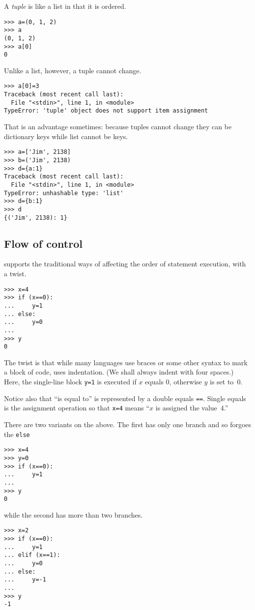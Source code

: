 A \textit{tuple} is like a list in that it is ordered.
\begin{lstlisting}[style=python]
>>> a=(0, 1, 2)
>>> a
(0, 1, 2)
>>> a[0]
0
\end{lstlisting}
Unlike a list, however, a tuple cannot change.
\begin{lstlisting}[style=python]
>>> a[0]=3
Traceback (most recent call last):
  File "<stdin>", line 1, in <module>
TypeError: 'tuple' object does not support item assignment
\end{lstlisting}
That is an advantage sometimes:
because tuples cannot change they can be dictionary keys while
list cannot be keys.
\begin{lstlisting}[style=python]
>>> a=['Jim', 2138]
>>> b=('Jim', 2138)
>>> d={a:1}
Traceback (most recent call last):
  File "<stdin>", line 1, in <module>
TypeError: unhashable type: 'list'
>>> d={b:1}
>>> d
{('Jim', 2138): 1}
\end{lstlisting}



\subsection{Flow of control}
\python{} supports the traditional ways of affecting the order of 
statement execution, with a twist.
\begin{lstlisting}[style=python]
>>> x=4
>>> if (x==0):
...     y=1
... else:
...     y=0
... 
>>> y
0
\end{lstlisting}
The twist is that while many languages use braces or some other syntax to
mark a block of code, \python{} uses indentation.
(We shall always indent with four spaces.)
Here, the single-line block \lstinline[style=inline]!y=1! is executed if $x$
equals $0$, otherwise $y$ is set to~$0$. 

Notice also that ``is equal to'' is represented by a double equals
\lstinline[style=inline]!==!. 
Single equals is the assignment
operation so that \lstinline[style=inline]!x=4! 
means ``$x$ is assigned the value~$4$.'' 

There are two variants on the above.
The first has only one branch and so forgoes the \lstinline[style=inline]!else!
\begin{lstlisting}[style=python]
>>> x=4
>>> y=0
>>> if (x==0):
...     y=1
... 
>>> y
0
\end{lstlisting}
while the second has more than two branches.
\begin{lstlisting}[style=python]
>>> x=2
>>> if (x==0):
...     y=1
... elif (x==1):
...     y=0
... else:
...     y=-1
... 
>>> y
-1
\end{lstlisting}

